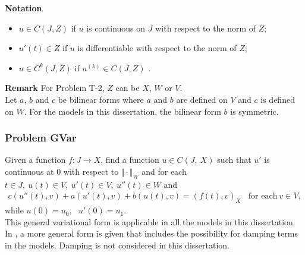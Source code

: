 \documentclass[../../main.tex]{subfiles}
\begin{document}
\textbf{Notation}
\begin{itemize}
	\item[] $u\in C(J,Z)$ if $u$ is continuous on $J$ with respect to the norm of $Z$;

	\item[] $u'(t)\in Z$ if $u$ is differentiable with respect to the norm of $Z$;

	\item[] $u\in C^{k}(J,Z)$ if $u^{(k)}\in C(J,Z)$ .
\end{itemize}

\textbf{Remark} For Problem T-2, $Z$ can be $X$, $W$ or $V$.\\

Let $a$, $b$ and $c$ be bilinear forms where $a$ and $b$ are defined on $V$ and $c$ is defined on $W$. For the models in this dissertation, the bilinear form $b$ is symmetric.




\subsubsection*{Problem GVar}\label{sssec:existence:ProblemGVar}
Given a function $f:J\rightarrow X$, find a function $u\in C(J,\ X)$ such that $u'$ is continuous at $0$ with respect to $\Vert \cdot \Vert_{W}$ and for each $t\in J,\ u(t)\in V,\ u'(t) \in V,\ u''(t)\in W$ and
\begin{eqnarray}
	c(u''(t),v)+a(u'(t),v)+b(u(t),v)= (f(t),v)_{X} \ \ \ \ \textrm{for each} \ v \in V, \label{eq:existence:ProblemGVar}
\end{eqnarray}
while $u(0)=u_{0},\ \ \ u'(0)=u_{1}$.\\

This general variational form is applicable in all the models in this dissertation. In \cite{VV02}, a more general form is given that includes the possibility for damping terms in the models. Damping is not considered in this dissertation.
\end{document}
